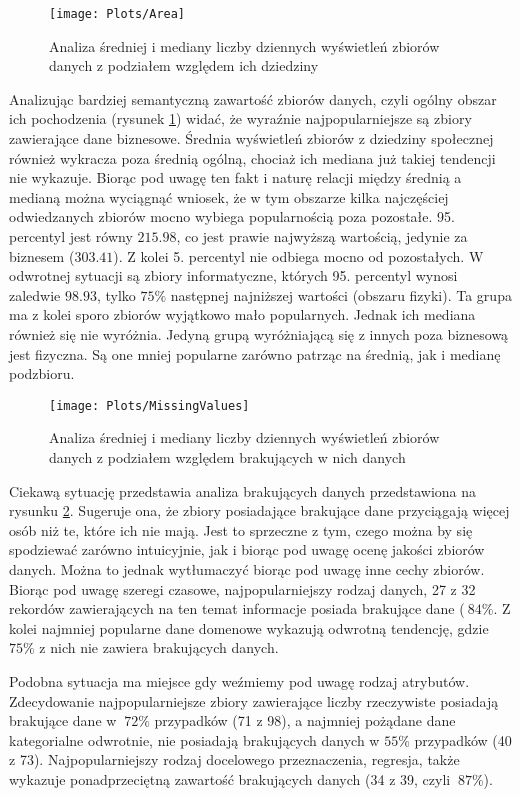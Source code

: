 \begin{figure}[ht]
  \texttt{[image: Plots/Area]}
  \caption{Analiza średniej i mediany liczby dziennych wyświetleń zbiorów danych z podziałem względem ich dziedziny}
  \label{fig:area}
\end{figure}

Analizując bardziej semantyczną zawartość zbiorów danych, czyli ogólny obszar ich pochodzenia (rysunek \ref{fig:area}) widać, że wyraźnie najpopularniejsze są zbiory zawierające dane biznesowe.
Średnia wyświetleń zbiorów z dziedziny społecznej również wykracza poza średnią ogólną, chociaż ich mediana już takiej tendencji nie wykazuje.
Biorąc pod uwagę ten fakt i naturę relacji między średnią a medianą można wyciągnąć wniosek, że w tym obszarze kilka najczęściej odwiedzanych zbiorów mocno wybiega popularnością poza pozostałe.
95. percentyl jest równy \(215.98\), co jest prawie najwyższą wartością, jedynie za biznesem (\(303.41\)).
Z kolei 5. percentyl nie odbiega mocno od pozostałych.
W odwrotnej sytuacji są zbiory informatyczne, których 95. percentyl wynosi zaledwie \(98.93\), tylko \(75\%\) następnej najniższej wartości (obszaru fizyki).
Ta grupa ma z kolei sporo zbiorów wyjątkowo mało popularnych.
Jednak ich mediana również się nie wyróżnia.
Jedyną grupą wyróżniającą się z innych poza biznesową jest fizyczna.
Są one mniej popularne zarówno patrząc na średnią, jak i medianę podzbioru.

\begin{figure}[ht]
      \texttt{[image: Plots/MissingValues]}
      \caption{Analiza średniej i mediany liczby dziennych wyświetleń zbiorów danych z podziałem względem brakujących w nich danych}
      \label{fig:missingvalues}
\end{figure}

Ciekawą sytuację przedstawia analiza brakujących danych przedstawiona na rysunku \ref{fig:missingvalues}.
Sugeruje ona, że zbiory posiadające brakujące dane przyciągają więcej osób niż te, które ich nie mają.
Jest to sprzeczne z tym, czego można by się spodziewać zarówno intuicyjnie, jak i biorąc pod uwagę ocenę jakości zbiorów danych.
Można to jednak wytłumaczyć biorąc pod uwagę inne cechy zbiorów.
Biorąc pod uwagę szeregi czasowe, najpopularniejszy rodzaj danych, 27 z 32 rekordów zawierających na ten temat informacje posiada brakujące dane (\(~84\%\).
Z kolei najmniej popularne dane domenowe wykazują odwrotną tendencję, gdzie \(75\%\) z nich nie zawiera brakujących danych.

Podobna sytuacja ma miejsce gdy weźmiemy pod uwagę rodzaj atrybutów.
Zdecydowanie najpopularniejsze zbiory zawierające liczby rzeczywiste posiadają brakujące dane w \(~72\%\) przypadków (71 z 98), a najmniej pożądane dane kategorialne odwrotnie, nie posiadają brakujących danych w \(55\%\) przypadków (40 z 73).
Najpopularniejszy rodzaj docelowego przeznaczenia, regresja, także wykazuje ponadprzeciętną zawartość brakujących danych (34 z 39, czyli \(~87\%\)).

